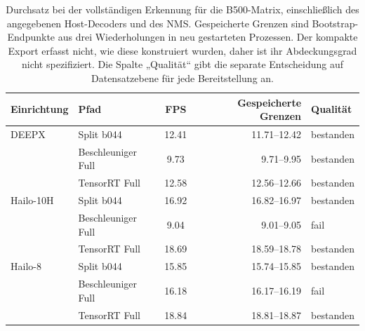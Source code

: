 \begin{table}[htbp]
\centering\small\TableSetup
\caption{Durchsatz bei der vollständigen Erkennung für die B500-Matrix, einschließlich des angegebenen Host-Decoders und des NMS. Gespeicherte Grenzen sind Bootstrap-Endpunkte aus drei Wiederholungen in neu gestarteten Prozessen. Der kompakte Export erfasst nicht, wie diese konstruiert wurden, daher ist ihr Abdeckungsgrad nicht spezifiziert. Die Spalte „Qualität“ gibt die separate Entscheidung auf Datensatzebene für jede Bereitstellung an.}
\label{tab:evaluation:yolov7_standard_native}
\begin{tabularx}{\linewidth}{@{}L{1.55cm}Y S[table-format=2.2]r l@{}}
\toprule
\textbf{Einrichtung} & \textbf{Pfad} & {\textbf{FPS}} & \textbf{Gespeicherte Grenzen} & \textbf{Qualität} \\
\midrule
DEEPX & Split b044 & 12.41 & \num{11.71}--\num{12.42} & bestanden \\
 & Beschleuniger Full & 9.73 & \num{9.71}--\num{9.95} & bestanden \\
 & TensorRT Full & 12.58 & \num{12.56}--\num{12.66} & bestanden \\
\addlinespace[.3em]
Hailo-10H & Split b044 & 16.92 & \num{16.82}--\num{16.97} & bestanden \\
 & Beschleuniger Full & 9.04 & \num{9.01}--\num{9.05} & fail \\
 & TensorRT Full & 18.69 & \num{18.59}--\num{18.78} & bestanden \\
\addlinespace[.3em]
Hailo-8 & Split b044 & 15.85 & \num{15.74}--\num{15.85} & bestanden \\
 & Beschleuniger Full & 16.18 & \num{16.17}--\num{16.19} & fail \\
 & TensorRT Full & 18.84 & \num{18.81}--\num{18.87} & bestanden \\
\bottomrule
\end{tabularx}
\end{table}
